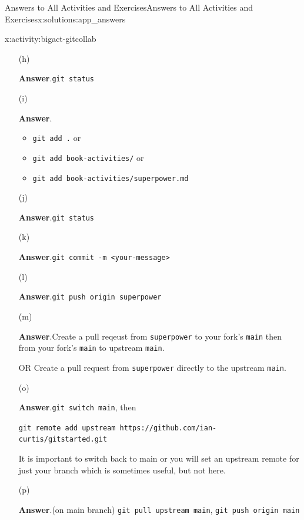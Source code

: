 \documentclass[oneside,10pt,]{book}
\newcommand{\blocktitlefont}{\relax}
\newcommand{\mono}[1]{\texttt{#1}}
\begin{document}
\begin{solutions-chapter}{Answers to All Activities and Exercises}{}{Answers to All Activities and Exercises}{}{}{x:solutions:app_answers}
\begin{activitysolution}{6.3}{}{x:activity:bigact-gitcollab}
\begin{enumerate}[font=\bfseries,label=(\alph*),ref=\alph*]
\item[(h)]\par\smallskip%
\noindent\textbf{\blocktitlefont Answer}.\hypertarget{g:answer:idm479273960-back}{}\quad{}\mono{git status}%
\item[(i)]\par\smallskip%
\noindent\textbf{\blocktitlefont Answer}.\hypertarget{g:answer:idm479270632-back}{}\quad{}%
\begin{itemize}[label=\textbullet]
\item{}\mono{git add .} or%
\item{}\mono{git add book-activities/} or%
\item{}\mono{git add book-activities/superpower.md}%
\end{itemize}
%
\item[(j)]\par\smallskip%
\noindent\textbf{\blocktitlefont Answer}.\hypertarget{g:answer:idm479264616-back}{}\quad{}\mono{git status}%
\item[(k)]\par\smallskip%
\noindent\textbf{\blocktitlefont Answer}.\hypertarget{g:answer:idm479267176-back}{}\quad{}\mono{git commit -m \textquotesingle{}<your-message>\textquotesingle{}}%
\item[(l)]\par\smallskip%
\noindent\textbf{\blocktitlefont Answer}.\hypertarget{g:answer:idm479263464-back}{}\quad{}\mono{git push origin superpower}%
\item[(m)]\par\smallskip%
\noindent\textbf{\blocktitlefont Answer}.\hypertarget{g:answer:idm479262824-back}{}\quad{}Create a pull reqeust from \mono{superpower} to your fork's \mono{main} then from your fork's \mono{main} to upstream \mono{main}.%
\par
OR Create a pull request from \mono{superpower} directly to the upstream \mono{main}.%
\item[(o)]\par\smallskip%
\noindent\textbf{\blocktitlefont Answer}.\hypertarget{g:answer:idm479258344-back}{}\quad{}\mono{git switch main}, then%
\par
\mono{git remote add upstream https://github.com/ian-curtis/gitstarted.git}%
\par
It is important to switch back to main or you will set an upstream remote for just your branch which is sometimes useful, but not here.%
\item[(p)]\par\smallskip%
\noindent\textbf{\blocktitlefont Answer}.\hypertarget{g:answer:idm479256808-back}{}\quad{}(on main branch) \mono{git pull upstream main}, \mono{git push origin main}%
\end{enumerate}
\end{activitysolution}%
\end{solutions-chapter}
\end{document}
